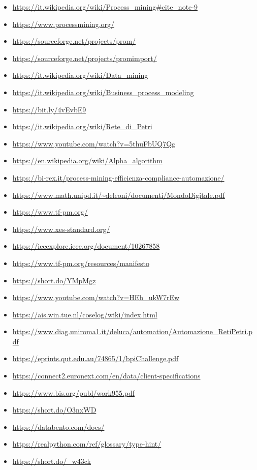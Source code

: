 \documentclass[10pt,final]{article}
\begin{document}
\begin{itemize}

\item \url{https://it.wikipedia.org/wiki/Process_mining#cite_note-9}
\item \url{https://www.processmining.org/}
\item \url{https://sourceforge.net/projects/prom/}
\item \url{https://sourceforge.net/projects/promimport/}
\item \url{https://it.wikipedia.org/wiki/Data_mining}
\item \url{https://it.wikipedia.org/wiki/Business_process_modeling}
\item \url{https://bit.ly/4vEvbE9}
\item \url{https://it.wikipedia.org/wiki/Rete_di_Petri}
\item \url{https://www.youtube.com/watch?v=5thuFbUQ7Qg}
\item \url{https://en.wikipedia.org/wiki/Alpha_algorithm}
\item \url{https://bi-rex.it/process-mining-efficienza-compliance-automazione/}
\item \url{https://www.math.unipd.it/~deleoni/documenti/MondoDigitale.pdf}
\item \url{https://www.tf-pm.org/}
\item \url{https://www.xes-standard.org/}
\item \url{https://ieeexplore.ieee.org/document/10267858}
\item \url{https://www.tf-pm.org/resources/manifesto}
\item \url{https://short.do/YMpMgz}
\item \url{https://www.youtube.com/watch?v=HEb_ukW7rEw}
\item \url{https://ais.win.tue.nl/coselog/wiki/index.html}
\item \url{https://www.diag.uniroma1.it/deluca/automation/Automazione_RetiPetri.pdf}
\item \url{https://eprints.qut.edu.au/74865/1/bpiChallenge.pdf}
\item \url{https://connect2.euronext.com/en/data/client-specifications}
\item \url{https://www.bis.org/publ/work955.pdf}
\item \url{https://short.do/O3nxWD}
\item \url{https://databento.com/docs/}
\item \url{https://realpython.com/ref/glossary/type-hint/}
\item \url{https://short.do/_w43ck}

\end{itemize}
\end{document}
